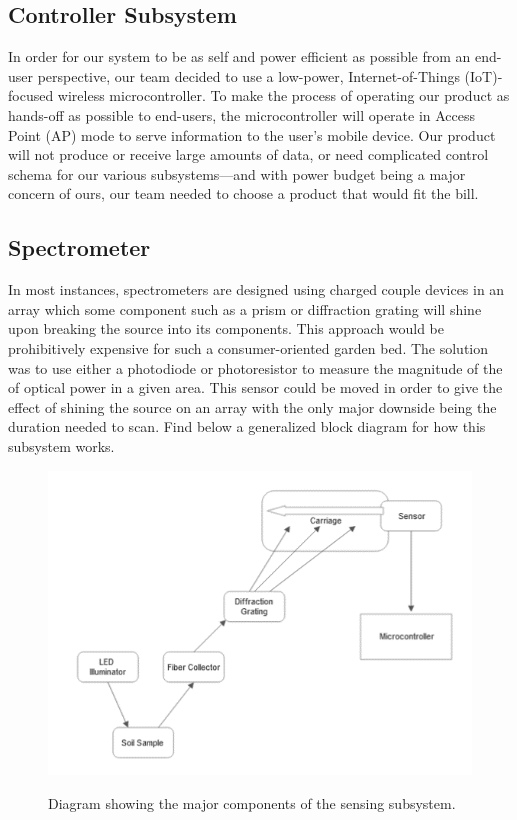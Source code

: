 \documentclass[journal]{IEEEtran}
\begin{document}
\subsection{Controller Subsystem}

In order for our system to be as self and power efficient as possible from an end-user perspective, our team decided to use a low-power, Internet-of-Things (IoT)-focused wireless microcontroller. To make the process of operating our product as hands-off as possible to end-users, the microcontroller will operate in Access Point (AP) mode to serve information to the user's mobile device. Our product will not produce or receive large amounts of data, or need complicated control schema for our various subsystems---and with power budget being a major concern of ours, our team needed to choose a product that would fit the bill.
\subsection{Spectrometer} 
In most instances, spectrometers are designed using charged couple devices in an array which some
component such as a prism or diffraction grating will shine upon breaking the source into its
components. This approach would be prohibitively expensive for such a consumer-oriented garden
bed. The solution was to use either a photodiode or photoresistor to measure the magnitude of the
of optical power in a given area\cite{Cao}. This sensor could be moved in order to give the effect of shining
the source on an array with the only major downside being the duration needed to scan. Find below a
generalized block diagram for how this subsystem works.
\begin{figure}[H]
	\centering
	\includegraphics[width=\linewidth]{images/OpticsBlockDiagram.png}
	\label{fig:sensing-block}
	\caption{Diagram showing the major components of the sensing subsystem.}
\end{figure}
\end{document}

